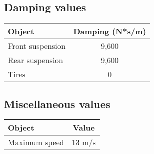 \subsection{Damping values}
\begin{center}
\begin{tabular}{| l | c |}
\hline
Object & Damping (N*s/m) \\
\hline
Front suspension & 9,600 \\
Rear suspension & 9,600 \\
Tires & 0 \\
\hline
\end{tabular}
\end{center}


\subsection{Miscellaneous values}
\begin{center}
\begin{tabular}{| l | c |}
\hline
Object & Value \\
\hline
Maximum speed & 13 m/s \\
\hline
\end{tabular}
\end{center}

